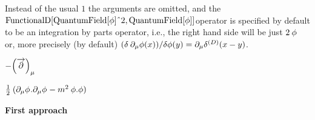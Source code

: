 Instead of the usual \(1\) the arguments are omitted, and the \(\Muserfunction{FunctionalD}[\Muserfunction{QuantumField}[\phi ]\RawWedge 2,\Muserfunction{QuantumField}[\phi
]]\)operator is specified by default to be an integration by parts operator, i.e., the right hand side will be just \(2\> \phi \) or, more precisely
(by default) \((\delta \> {{\partial }_{\mu }}\phi (x))/\delta \phi (y)={{\partial }_{\mu }}{{\delta }^{(D)}}(x-y)\).

\dispSFinmath{
{{\partial }_{\mu }}
}

\dispSFoutmath{
-{{\partial }_{\mu }},
}

\(-{{\left( \overvar{\partial }{\rightarrow } \right) }_{\mu }}\)


\dispSFoutmath{
-{{\left( \overvar{\partial }{\rightarrow } \right) }_{\mu }}
}



\(\frac{1}{2}\> ({{\partial }_{\mu }}\phi _{ }^{ }.{{\partial }_{\mu }}\phi _{ }^{ }-{m^2}\> \phi .\phi )\)

{\bfseries First approach}





